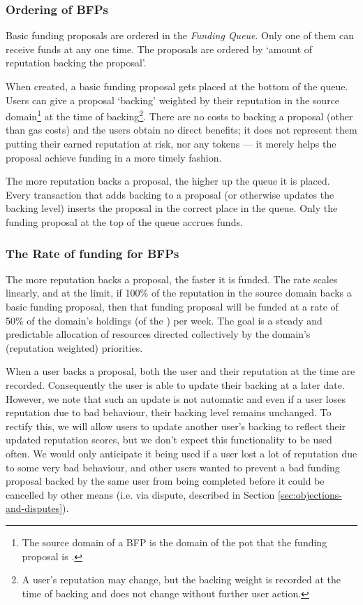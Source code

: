 \subsubsection{Ordering of BFPs}
Basic funding proposals are ordered in the \emph{Funding Queue}. Only one of them can receive funds at any one time. The proposals are ordered by `amount of reputation backing the proposal'.

When created, a basic funding proposal gets placed at the bottom of the queue. Users can give a proposal `backing' weighted by their reputation in the source domain\footnote{The source domain of a BFP is the domain of the pot that the funding proposal is .} at the time of backing\footnote{A user's reputation may change, but the backing weight is recorded at the time of backing and does not change without further user action.}. There are no costs to backing a proposal (other than gas costs) and the users obtain no direct benefits; it does not represent them putting their earned reputation at risk, nor any tokens --- it merely helps the proposal achieve funding in a more timely fashion.

The more reputation backs a proposal, the higher up the queue it is placed. Every transaction that adds backing to a proposal (or otherwise updates the backing level) inserts the proposal in the correct place in the queue. Only the funding proposal at the top of the queue accrues funds.

\subsubsection{The Rate of funding for BFPs}
The more reputation backs a proposal, the faster it is funded. The rate scales linearly, and at the limit, if 100\% of the reputation in the source domain backs a basic funding proposal, then that funding proposal will be funded at a rate of 50\% of the domain's holdings (of the ) per week. The goal is a steady and predictable allocation of resources directed collectively by the domain's (reputation weighted) priorities.

When a user backs a proposal, both the user and their reputation at the time are recorded. Consequently the user is able to update their backing at a later date. However, we note that such an update is not automatic and even if a user loses reputation due to bad behaviour, their backing level remains unchanged. To rectify this, we will allow users to update another user's backing to reflect their updated reputation scores, but we don't expect this functionality to be used often. We would only anticipate it being used if a user lost a lot of reputation due to some very bad behaviour, and other users wanted to prevent a bad funding proposal backed by the same user from being completed before it could be cancelled by other means (i.e. via dispute, described in Section \ref{sec:objections-and-disputes}).

